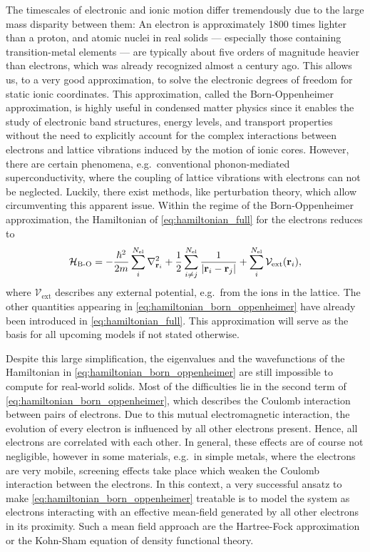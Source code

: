 \documentclass[../../main.tex]{subfiles}
\begin{document}
The timescales of electronic and ionic motion differ tremendously due to the large mass disparity between them: An electron is approximately 1800 times lighter than a proton, and atomic nuclei in real solids --- especially those containing transition-metal elements --- are typically about five orders of magnitude heavier than electrons, which was already recognized almost a century ago. This allows us, to a very good approximation, to solve the electronic degrees of freedom for static ionic coordinates. This approximation, called the Born-Oppenheimer approximation, is highly useful in condensed matter physics since it enables the study of electronic band structures, energy levels, and transport properties without the need to explicitly account for the complex interactions between electrons and lattice vibrations induced by the motion of ionic cores. However, there are certain phenomena, e.g.\ conventional phonon-mediated superconductivity, where the coupling of lattice vibrations with electrons can not be neglected. Luckily, there exist methods, like perturbation theory, which allow circumventing this apparent issue. Within the regime of the Born-Oppenheimer approximation, the Hamiltonian of \eqref{eq:hamiltonian_full} for the electrons reduces to
\begin{align}\label{eq:hamiltonian_born_oppenheimer}
	\mathcal{H}_{\text{B-O}}=-\frac{\hbar^2}{2m}\sum_i^{N_{\text{el}}} \nabla^2_{\textbf{r}_i}+\frac 12\sum_{i\neq j}^{N_{\text{el}}} \frac{1}{|\textbf{r}_i-\textbf{r}_j|}+\sum_i^{N_{\text{el}}}\mathcal{V}_{\text{ext}}(\textbf{r}_i),
\end{align}
where $\mathcal{V}_{\text{ext}}$ describes any external potential, e.g.\ from the ions in the lattice. The other quantities appearing in \eqref{eq:hamiltonian_born_oppenheimer} have already been introduced in \eqref{eq:hamiltonian_full}. This approximation will serve as the basis for all upcoming models if not stated otherwise.

Despite this large simplification, the eigenvalues and the wavefunctions of the Hamiltonian in \eqref{eq:hamiltonian_born_oppenheimer} are still impossible to compute for real-world solids. Most of the difficulties lie in the second term of \eqref{eq:hamiltonian_born_oppenheimer}, which describes the Coulomb interaction between pairs of electrons. Due to this mutual electromagnetic interaction, the evolution of every electron is influenced by all other electrons present. Hence, all electrons are correlated with each other. In general, these effects are of course not negligible, however in some materials, e.g.\ in simple metals, where the electrons are very mobile, screening effects take place which weaken the Coulomb interaction between the electrons. In this context, a very successful ansatz to make \eqref{eq:hamiltonian_born_oppenheimer} treatable is to model the system as electrons interacting with an effective mean-field generated by all other electrons in its proximity. Such a mean field approach are the Hartree-Fock approximation or the Kohn-Sham equation of density functional theory. 
\end{document}
